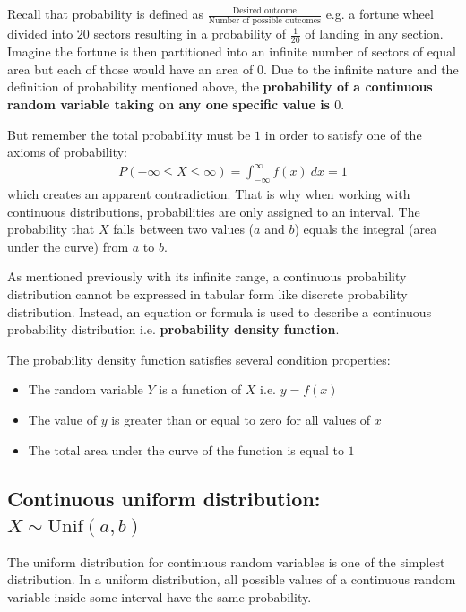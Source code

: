 \documentclass[10pt,a4paper]{article}
\begin{document}
Recall that probability is defined as $\frac{\text{Desired outcome}}{\text{Number of possible
outcomes}}$ e.g. a fortune wheel divided into $20$ sectors resulting in a probability of
$\frac{1}{20}$ of landing in any section. Imagine the fortune is then partitioned into an infinite number of
sectors of equal area but each of those would have an area of $0$. Due to the infinite nature and
the definition of probability mentioned above, the \textbf{probability of a continuous random
variable taking on any one specific value is $0$}. 

But remember the total probability must be $1$ in order to satisfy one of the axioms of probability:
\begin{align*}
    P(-\infty \leq X \leq \infty) = \int_{-\infty}^{\infty}f(x)\: dx = 1
\end{align*} 
which creates an apparent contradiction. That is why when working with continuous distributions,
probabilities are only assigned to an interval. The probability that $X$ falls between two values
($a$ and $b$) equals the integral (area under the curve) from $a$ to $b$.

As mentioned previously with its infinite range, a continuous probability distribution cannot be
expressed in tabular form like discrete probability distribution. Instead, an equation or formula is
used to describe a continuous probability distribution i.e. \textbf{probability density function}.

The probability density function satisfies several condition properties:
\begin{itemize}
    \item The random variable $Y$ is a function of $X$ i.e. $y = f(x)$
    \item The value of $y$ is greater than or equal to zero for all values of $x$
    \item The total area under the curve of the function is equal to $1$
\end{itemize}

\pagebreak

\subsection{Continuous uniform distribution: $X \sim \text{Unif}(a,b)$}

The uniform distribution for continuous random variables is one of the simplest distribution. In a
uniform distribution, all possible values of a continuous random variable inside some interval have
the same probability. 
\end{document}
